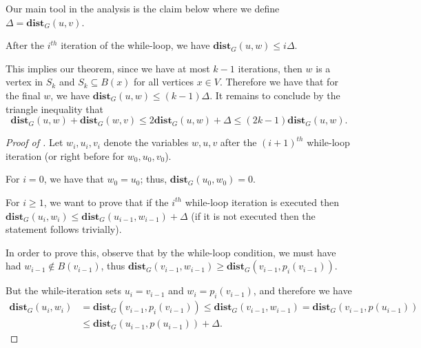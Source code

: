 Our main tool in the analysis is the claim below where we define $\Delta = \mathbf{dist}_G(u,v)$. 

\begin{claim}\label{claim:DistanceOracleSwapping} After the $i^{th}$ iteration of the while-loop, we have $\mathbf{dist}_G(u,w) \leq i\Delta$.
\end{claim}

This implies our theorem, since we have at most $k-1$ iterations, then $w$ is a vertex in $S_k$ and $S_k \subseteq B(x)$ for all vertices $x \in V$. Therefore we have that for the final $w$, we have $\mathbf{dist}_G(u,w) \leq (k-1)\Delta$. It remains to conclude by the triangle inequality that 
\[
\mathbf{dist}_G(u,w) + \mathbf{dist}_G(w,v) \leq 2\mathbf{dist}_G(u,w) + \Delta \leq (2k-1)\mathbf{dist}_G(u,w).
\]

\begin{proof}[Proof of ]
Let $w_i, u_i, v_i$ denote the variables $w,u,v$ after the $(i+1)^{th}$ while-loop iteration (or right before for $w_0,u_0,v_0$).

For $i = 0$, we have that $w_0 = u_0$; thus, $\mathbf{dist}_G(u_0,w_0) = 0$.

For $i \geq 1$, we want to prove that if the $i^{th}$ while-loop iteration is executed then $\mathbf{dist}_G(u_i,w_i) \leq \mathbf{dist}_G(u_{i-1},w_{i-1}) + \Delta$ (if it is not executed then the statement follows trivially).

In order to prove this, observe that by the while-loop condition, we must have had $w_{i-1} \not\in B(v_{i-1})$, thus  $\mathbf{dist}_G(v_{i-1}, w_{i-1}) \geq \mathbf{dist}_G(v_{i-1}, p_i(v_{i-1}))$.

But the while-iteration sets $u_i = v_{i-1}$ and $w_i = p_i(v_{i-1})$, and therefore we have
\begin{align*}
\mathbf{dist}_G(u_{i}, w_i) &= \mathbf{dist}_G(v_{i-1}, p_i(v_{i-1})) \leq
\mathbf{dist}_G(v_{i-1}, w_{i-1}) = \mathbf{dist}_G(v_{i-1}, p(u_{i-1})) \\&\leq \mathbf{dist}_G(u_{i-1}, p(u_{i-1})) + \Delta.
\end{align*}
\end{proof}